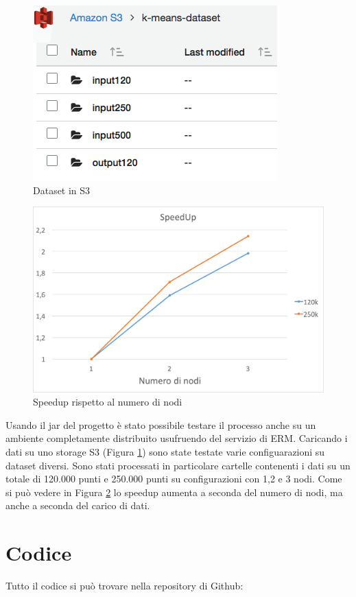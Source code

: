 \documentclass[10pt,twocolumn,letterpaper]{article}
\begin{document}
    \begin{figure}
        \centering
        \includegraphics[width=\linewidth]{../img/s3.png}
        \caption{Dataset in S3}
        \label{fig:fig4}
    \end{figure}

    \begin{figure}
        \centering
        \includegraphics[width=\linewidth]{../img/speedUp.png}
        \caption{Speedup rispetto al numero di nodi}
        \label{fig:fig5}
    \end{figure}

    Usando il jar del progetto è stato possibile testare il processo anche su
    un ambiente completamente distribuito usufruendo del servizio di ERM.
    Caricando i dati su uno storage S3 (Figura \ref{fig:fig4}) sono state
    testate varie configuarazioni su dataset diversi.
    Sono stati processati in particolare cartelle contenenti i dati su un totale di
    120.000 punti e 250.000 punti su configurazioni con 1,2 e 3 nodi.
    Come si può vedere in Figura \ref{fig:fig5} lo speedup aumenta a seconda del
    numero di nodi, ma anche a seconda del carico di dati.

\section{Codice}
    Tutto il codice si può trovare nella repository di Github:
\end{document}
